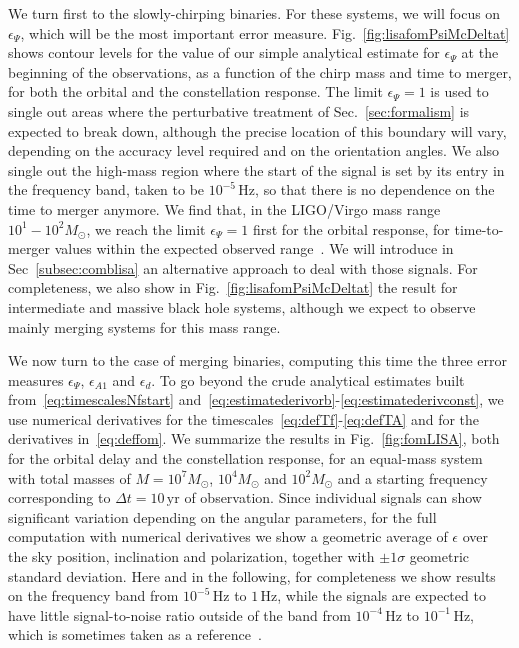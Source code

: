 \documentclass[aps,showpacs,twocolumn,
prd,superscriptaddress,nofootinbib]{revtex4-1}
\newcommand{\Hz}{\,\mathrm{Hz}}
\newcommand{\yr}{\,\mathrm{yr}}
\newcommand{\Msol}{M_{\odot}}
\begin{document}
We turn first to the slowly-chirping binaries. For these systems, we will focus on $\epsilon_{\Psi}$, which will be the most important error measure. Fig.~\ref{fig:lisafomPsiMcDeltat} shows contour levels for the value of our simple analytical estimate for $\epsilon_{\Psi}$ at the beginning of the observations, as a function of the chirp mass and time to merger, for both the orbital and the constellation response. The limit $\epsilon_{\Psi} = 1$ is used to single out areas where the perturbative treatment of Sec.~\ref{sec:formalism} is expected to break down, although the precise location of this boundary will vary, depending on the accuracy level required and on the orientation angles. We also single out the high-mass region where the start of the signal is set by its entry in the frequency band, taken to be $10^{-5}\Hz$, so that there is no dependence on the time to merger anymore. We find that, in the LIGO/Virgo mass range $10^{1}-10^{2} \Msol$, we reach the limit $\epsilon_{\Psi}=1$ first for the orbital response, for time-to-merger values within the expected observed range~\cite{Sesana16}. We will introduce in Sec~\ref{subsec:comblisa} an alternative approach to deal with those signals. For completeness, we also show in Fig.~\ref{fig:lisafomPsiMcDeltat} the result for intermediate and massive black hole systems, although we expect to observe mainly merging systems for this mass range. 

We now turn to the case of merging binaries, computing this time the three error measures $\epsilon_{\Psi}$, $\epsilon_{A1}$ and $\epsilon_{d}$. To go beyond the crude analytical estimates built from~\eqref{eq:timescalesNfstart} and~\eqref{eq:estimatederivorb}-\eqref{eq:estimatederivconst}, we use numerical derivatives for the timescales~\eqref{eq:defTf}-\eqref{eq:defTA} and for the derivatives in~\eqref{eq:deffom}. We summarize the results in Fig.~\ref{fig:fomLISA}, both for the orbital delay and the constellation response, for an equal-mass system with total masses of $M=10^{7} \Msol$, $10^{4} \Msol$ and $10^{2} \Msol$ and a starting frequency corresponding to $\Delta t =10 \yr$ of observation. Since individual signals can show significant variation depending on the angular parameters, for the full computation with numerical derivatives we show a geometric average of $\epsilon$ over the sky position, inclination and polarization, together with $\pm 1\sigma$ geometric standard deviation. Here and in the following, for completeness we show results on the frequency band from $10^{-5}\Hz$ to $1\Hz$, while the signals are expected to have little signal-to-noise ratio outside of the band from $10^{-4}\Hz$ to $10^{-1}\Hz$, which is sometimes taken as a reference~\cite{LISA17}.
\end{document}
